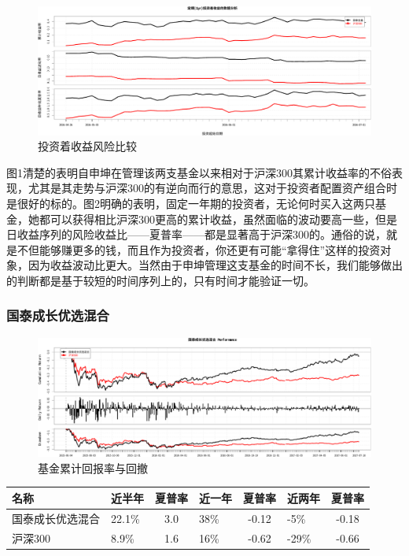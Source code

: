\documentclass[hyperref,]{ctexart}
\begin{document}
\begin{figure}[htbp]
\centering
\includegraphics{shenkun-details_files/figure-latex/unnamed-chunk-3-1.pdf}
\caption{投资着收益风险比较}
\end{figure}

图1清楚的表明自申坤在管理该两支基金以来相对于沪深300其累计收益率的不俗表现，尤其是其走势与沪深300的有逆向而行的意思，这对于投资者配置资产组合时是很好的标的。图2明确的表明，固定一年期的投资者，无论何时买入这两只基金，她都可以获得相比沪深300更高的累计收益，虽然面临的波动要高一些，但是日收益序列的风险收益比------夏普率------都是显著高于沪深300的。通俗的说，就是不但能够赚更多的钱，而且作为投资者，你还更有可能``拿得住''这样的投资对象，因为收益波动比更大。当然由于申坤管理这支基金的时间不长，我们能够做出的判断都是基于较短的时间序列上的，只有时间才能验证一切。

\subsubsection{国泰成长优选混合}

\begin{figure}[htbp]
\centering
\includegraphics{shenkun-details_files/figure-latex/unnamed-chunk-4-1.pdf}
\caption{基金累计回报率与回撤}
\end{figure}

\begin{longtable}[]{@{}llclclc@{}}
\toprule
名称 & 近半年 & 夏普率 & 近一年 & 夏普率 & 近两年 &
夏普率\tabularnewline
\midrule
\endhead
国泰成长优选混合 & 22.1\% & 3.0 & 38\% & -0.12 & -5\% &
-0.18\tabularnewline
沪深300 & 8.9\% & 1.6 & 16\% & -0.62 & -29\% & -0.66\tabularnewline
\bottomrule
\end{longtable}
\end{document}
